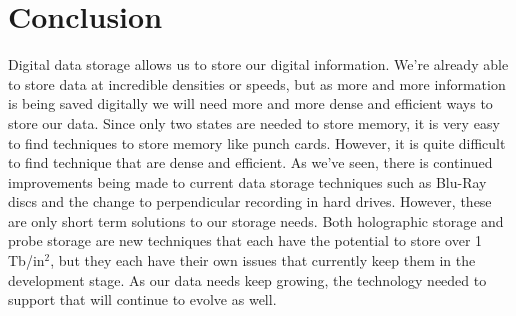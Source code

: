 \documentclass[ notitlepage, numerical, 11pt]{revtex4-1} %
\begin{document}
\section{Conclusion}
Digital data storage allows us to store our digital information. We're already able to store data at incredible densities or speeds, but as more and more information is being saved digitally we will need more and more dense and efficient ways to store our data. Since only two states are needed to store memory, it is very easy to find techniques to store memory like punch cards. However, it is quite difficult to find technique that are dense and efficient. As we've seen, there is continued improvements being made to current data storage techniques such as Blu-Ray discs and the change to perpendicular recording in hard drives. However, these are only short term solutions to our storage needs. Both holographic storage and probe storage are new techniques that each have the potential to store over 1 Tb/in$^2$, but they each have their own issues that currently keep them in the development stage. As our data needs keep growing, the technology needed to support that will continue to evolve as well.





\end{document}
